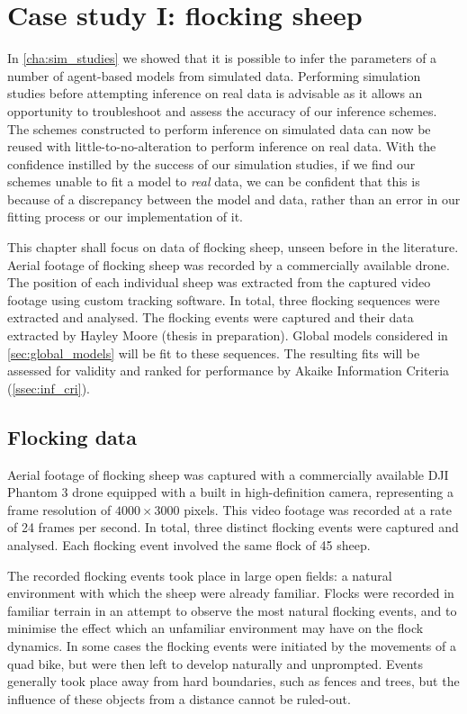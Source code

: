 \graphicspath{{fig/sheep/}}

\chapter{Case study I: flocking sheep}
\label{cha:sheep}

In \cref{cha:sim_studies} we showed that it is possible to infer the parameters
of a number of agent-based models from simulated data. Performing simulation
studies before attempting inference on real data is advisable as it allows an
opportunity to troubleshoot and assess the accuracy of our inference schemes.
The schemes constructed to perform inference on simulated data can now be
reused with little-to-no-alteration to perform inference on real data. With the
confidence instilled by the success of our simulation studies, if we find our
schemes unable to fit a model to \emph{real} data, we can be confident that
this is because of a discrepancy between the model and data, rather than an
error in our fitting process or our implementation of it.

This chapter shall focus on data of flocking sheep, unseen before in the
literature. Aerial footage of flocking sheep was recorded by a commercially
available drone. The position of each individual sheep was extracted from the
captured video footage using custom tracking software. In total, three flocking
sequences were extracted and analysed. The flocking events were captured and
their data extracted by Hayley Moore (thesis in preparation). Global models
considered in \cref{sec:global_models} will be fit to these sequences. The
resulting fits will be assessed for validity and ranked for performance by
Akaike Information Criteria (\cref{ssec:inf_cri}).

\section{Flocking data}
\label{sec:data}

Aerial footage of flocking sheep was captured with a commercially available DJI
Phantom 3 drone equipped with a built in high-definition camera, representing
a frame resolution of $4000\times3000$ pixels. This video footage was recorded
at a rate of 24 frames per second. In total, three distinct flocking events
were captured and analysed. Each flocking event involved the same flock of 45
sheep.

The recorded flocking events took place in large open fields: a natural
environment with which the sheep were already familiar. Flocks were recorded in
familiar terrain in an attempt to observe the most natural flocking events, and
to minimise the effect which an unfamiliar environment may have on the flock
dynamics. In some cases the flocking events were initiated by the movements of
a quad bike, but were then left to develop naturally and unprompted. Events
generally took place away from hard boundaries, such as fences and trees, but
the influence of these objects from a distance cannot be ruled-out.

